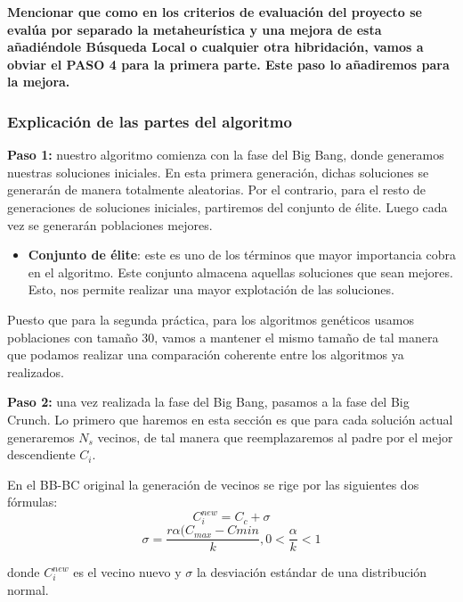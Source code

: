 \documentclass[10pt, a4paper]{article}
\theoremstyle{theorem-style}
\theoremstyle{theorem-style}
\theoremstyle{theorem2-style}
\theoremstyle{definition-style}
\theoremstyle{remark-style}
\theoremstyle{example-style}
\theoremstyle{definition-style}
\theoremstyle{remark-style}
\theoremstyle{remark-style}
\begin{document}
\begin{tcolorbox}
\textbf{Mencionar que como en los criterios de evaluación del proyecto se evalúa por separado la metaheurística y una mejora de esta añadiéndole Búsqueda Local o cualquier otra hibridación, vamos a obviar el PASO 4 para la primera parte. Este paso lo añadiremos para la mejora. }
\end{tcolorbox}

\subsubsection{Explicación de las partes del algoritmo}

\textbf{Paso 1:} nuestro algoritmo comienza con la fase del Big Bang, donde generamos nuestras soluciones iniciales. En esta primera generación, dichas soluciones se generarán de manera totalmente aleatorias. Por el contrario, para el resto de generaciones de soluciones iniciales, partiremos del conjunto de élite. Luego cada vez se generarán poblaciones mejores. 

\begin{itemize}
\item \textbf{Conjunto de élite}: este es uno de los términos que mayor importancia cobra en el algoritmo. Este conjunto almacena aquellas soluciones que sean mejores. Esto, nos permite realizar una mayor explotación de las soluciones.  
\end{itemize}

Puesto que para la segunda práctica, para los algoritmos genéticos usamos poblaciones con tamaño 30, vamos a mantener el mismo tamaño de tal manera que podamos realizar una comparación coherente entre los algoritmos ya realizados. 

\textbf{Paso 2: } una vez realizada la fase del Big Bang, pasamos a la fase del Big Crunch. Lo primero que haremos en esta sección es que para cada solución actual generaremos $N_s$ vecinos, de tal manera que reemplazaremos al padre por el mejor descendiente $C_i$. 

En el BB-BC original la generación de vecinos se rige por las siguientes dos fórmulas: 
\begin{equation}
C_i^{new} = C_c + \sigma
\end{equation}
\begin{equation}
\sigma = \frac{r\alpha(C_{max} - C{min}}{k}, 0 < \frac{\alpha}{k} < 1
\end{equation}

donde $C_i^{new}$ es el vecino nuevo y $\sigma$ la desviación estándar de una distribución normal. 
\end{document}
